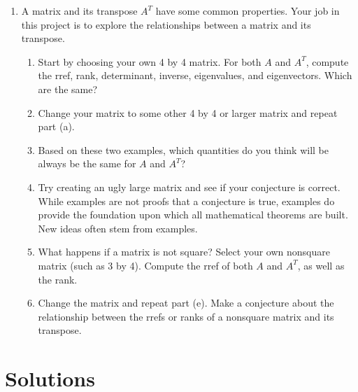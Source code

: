 \begin{enumerate}
	\item A matrix and its transpose $A^T$ have some common properties. Your job in this project is to explore the relationships between a matrix and its transpose.	
	
\begin{enumerate}
	\item Start by choosing your own 4 by 4 matrix.  For both $A$ and $A^T$, compute the rref, rank, determinant, inverse, eigenvalues, and eigenvectors. Which are the same? 
	\item Change your matrix to some other 4 by 4 or larger matrix and repeat part (a). 
	\item Based on these two examples, which quantities do you think will be always be the same for $A$ and $A^T$? 
	\item Try creating an ugly large matrix and see if your conjecture is correct. While examples are not proofs that a conjecture is true, examples do provide the foundation upon which all mathematical theorems are built.  New ideas often stem from examples.
	\item What happens if a matrix is not square? Select your own nonsquare matrix (such as 3 by 4). Compute the rref of both $A$ and $A^T$, as well as the rank. 
	\item Change the matrix and repeat part (e). Make a conjecture about the relationship between the rrefs or ranks of a nonsquare matrix and its transpose.
\end{enumerate}
\end{enumerate}








\section{Solutions}




